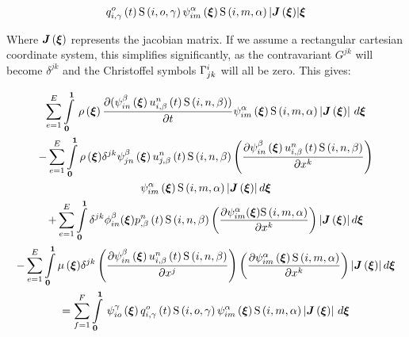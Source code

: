 \begin{multline}
{    \fnof{\idxnodedof{q}{i}{o}{\gamma}}{t}\idxgsf{i}{o}{\gamma}
    \idxgbfn{i}{m}{\alpha}{\vectr{\xi}}\idxgsf{i}{m}{\alpha}
    \abs{\fnof{\matr{J}}{\vectr{\xi}}}}{\vectr{\xi}}
\end{multline}

Where $\fnof{\matr{J}}{\vectr{\xi}}$ represents the jacobian matrix. If we assume a rectangular cartesian coordinate system, this simplifies significantly, as the contravariant $G^{jk}$ will become $\delta^{jk}$ and the Christoffel symbols $ \Gamma^{i}_{jk} $ will all be zero. This gives:

\begin{multline}
 \label{NSEFEM3}
  \dsum_{e=1}^{E}\gint{\vectr{0}}{\vectr{1}}{\fnof{\rho}{\vectr{\xi}}\delby{(\idxgbfn{i}{n}{\beta}{\vectr{\xi}}
      \fnof{\idxnodedof{u}{i}{n}{\beta}}{t}\idxgsf{i}{n}{\beta})}{t}
    \idxgbfn{i}{m}{\alpha}{\vectr{\xi}}\idxgsf{i}{m}{\alpha}
    \abs{\fnof{\matr{J}}{\vectr{\xi}}}}{\vectr{\xi}}\\
  - \dsum_{e=1}^{E}\dintl{\vectr{0}}{\vectr{1}}{\fnof{\rho}{\vectr{\xi}}}\delta^{jk}\idxgbfn{j}{n}{\beta}{\vectr{\xi}}
  \fnof{\idxnodedof{u}{j}{n}{\beta}}{t}\idxgsf{i}{n}{\beta}
  \pbrac{\delby{\idxgbfn{i}{n}{\beta}{\vectr{\xi}}\fnof{\idxnodedof{u}{i}{n}{\beta}}{t}
   \idxgsf{i}{n}{\beta}}{x^{k}}}\\
  \idxgbfn{i}{m}{\alpha}{\vectr{\xi}}\idxgsf{i}{m}{\alpha}
  \abs{\fnof{\matr{J}}{\vectr{\xi}}}d\vectr{\xi}\\
  +\dsum_{e=1}^{E}\dintl{\vectr{0}}{\vectr{1}}\delta^{jk}\phi_{in}^{\beta}({\vectr{\xi}})
  \fnof{\idxnodedof{p}{}{n}{\beta}}{t}\idxgsf{i}{n}{\beta}
  \pbrac{\delby{\psi_{im}^{\alpha}({\vectr{\xi}})\idxgsf{i}{m}{\alpha}}{x^{k}}}\abs{\fnof{\matr{J}}{\vectr{\xi}}}d\vectr{\xi}\\
  -\dsum_{e=1}^{E}\dintl{\vectr{0}}{\vectr{1}}{\fnof{\mu}{\vectr{\xi}}}\delta^{jk}\pbrac{\delby{\idxgbfn{i}{n}{\beta}{\vectr{\xi}}
     \fnof{\idxnodedof{u}{i}{n}{\beta}}{t}\idxgsf{i}{n}{\beta}}{x^{j}}}
    \pbrac{\delby{\idxgbfn{i}{m}{\alpha}{\vectr{\xi}}\idxgsf{i}{m}{\alpha}}{x^{k}}}
    \abs{\fnof{\matr{J}}{\vectr{\xi}}}d\vectr{\xi}\\
  =\dsum_{f=1}^{F}\gint{\vectr{0}}{\vectr{1}}{\idxgbfn{i}{o}{\gamma}{\vectr{\xi}}
    \fnof{\idxnodedof{q}{i}{o}{\gamma}}{t}\idxgsf{i}{o}{\gamma}
    \idxgbfn{i}{m}{\alpha}{\vectr{\xi}}\idxgsf{i}{m}{\alpha}
    \abs{\fnof{\matr{J}}{\vectr{\xi}}}}{\vectr{\xi}}
\end{multline} 

